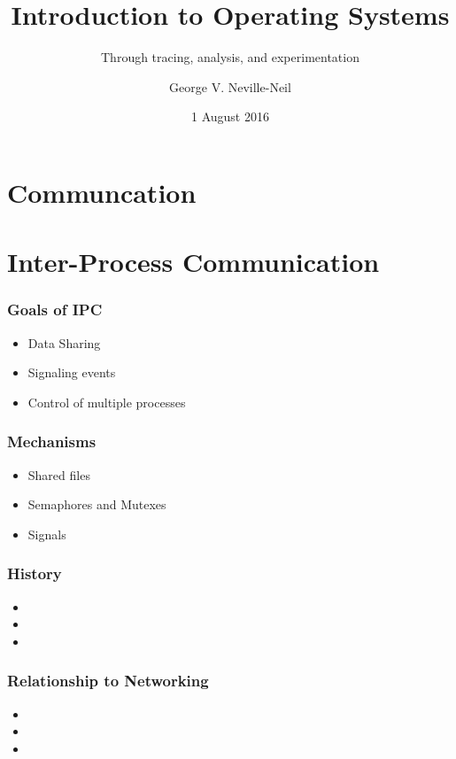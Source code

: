 \documentclass[pdftex]{beamer} %
\begin{document}

\title{Introduction to Operating Systems}
\subtitle{Through tracing, analysis, and experimentation}
\author{George V. Neville-Neil}
\date{1 August 2016}

\begin{frame}
  \titlepage
\end{frame}

\section{Communcation}
\label{sec:communication}

\section{Inter-Process Communication}
\label{sec:ipc}

\begin{frame}
  \frametitle{Goals of IPC}
  \begin{itemize}
  \item Data Sharing
  \item Signaling events
  \item Control of multiple processes
  \end{itemize}
\end{frame}

\begin{frame}
  \frametitle{Mechanisms}
  \begin{itemize}
  \item Shared files
  \item Semaphores and Mutexes
  \item Signals
  \end{itemize}
\end{frame}

\begin{frame}
  \frametitle{History}
  \begin{itemize}
  \item 
  \item 
  \item 
  \end{itemize}
\end{frame}

\begin{frame}
  \frametitle{Relationship to Networking}
  \begin{itemize}
  \item 
  \item 
  \item 
  \end{itemize}
\end{frame}
\end{document}
